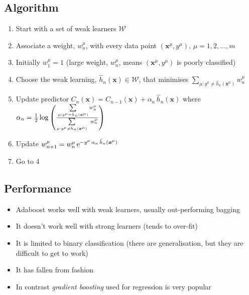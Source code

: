 \begin{slide}
\section[-2]{Algorithm}

\begin{PauseHighLight}
  \small
  \begin{enumerate}
  \item Start with a set of weak learners $\mathcal{W}$\pause
  \item Associate a weight, $w_n^\mu$, with every data point
    $(\bm{x}^\mu, y^\mu)$, $\mu=1,2,\ldots,m$\pause
  \item Initially $w_1^\mu=1$\pause{} (large weight, $w_n^\mu$, means
    $(\bm{x}^\mu, y^\mu)$ is poorly classified)\pauseb
  \item Choose the weak learning, $\hat{h}_n(\bm{x})\in\mathcal{W}$, that minimises
    $\sum\limits_{\mu:y^\mu\neq \hat{h}_n(\bm{x}^\mu)}\!\!\!
    w_n^\mu$\pause
  \item Update predictor $C_n(\bm{x}) = C_{n-1}(\bm{x}) + \alpha_n \,
    \hat{h}_n(\bm{x})$ where $\alpha_n=  \frac{1}{2} \logg{\frac{\sum\limits_{\mu:y^\mu=
      \hat{h}_n(\bm{x}^\mu)}  w_n^\mu}{
                \sum\limits_{\mu:y^\mu\neq \hat{h}_n(\bm{x}^\mu)}\ w_n^\mu}}$\pause
  \item Update $w_{n+1}^\mu = w_{n}^\mu\, {\rm e}^{-y^\mu\, \alpha_n \, \hat{h}_n(\bm{x}^\mu)}$\pause
  \item Go to 4\pause
  \end{enumerate}
\end{PauseHighLight}

\end{slide}



\begin{slide}
\section{Performance}

\begin{PauseHighLight}
  \begin{itemize}
  \item Adaboost works well with weak learners, usually out-performing
    bagging\pause
  \item It doesn't work well with strong learners (tends to
    over-fit)\pause
  \item It is limited to binary classification (there are
    generalisation, but they are difficult to get to work)\pause
  \item It has fallen from fashion\pause
  \item In contrast \emph{gradient boosting} used for regression is
    very popular\pause
  \end{itemize}
\end{PauseHighLight}

\end{slide}

